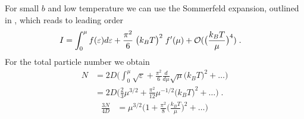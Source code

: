 %
For small $b$ and low temperature we can use the Sommerfeld expansion, outlined in ,
%
%
which reads to leading order
%
\begin{align*}
I &= \int_{0}^{\mu} f(\varepsilon) d\varepsilon +  \frac{\pi^{2}}{6}\;\big(k_{B}T\big)^{2} \;f'(\mu)+ {\cal O}(\big(\frac{k_{B}T}{\mu}\big)^{4})\;.
\end{align*}
%
For the total particle number we obtain
\begin{align*}
N&=2 D \bigg(\int_{0}^{\mu}\sqrt{\varepsilon} 
+\frac{\pi^{2}}{6}\frac{d}{d\mu}\sqrt{\mu}\bigg( k_{B}T \bigg)^{2}+\ldots\bigg)\\
&=2 D \bigg(\frac{2}{3}\mu^{3/2} 
+\frac{\pi^{2}}{12}\mu^{-1/2}\big( k_{B}T \big)^{2}+\ldots
\bigg)\;.
\end{align*}
%
%
\begin{align}\label{eq:spin:para:aux2}
\frac{3 N}{4 D}&= \mu^{3/2}\bigg(1
+\frac{\pi^{2}}{8}\bigg(\frac{ k_{B}T }{\mu}\bigg)^{2}+\ldots
\bigg)
\end{align}
%

